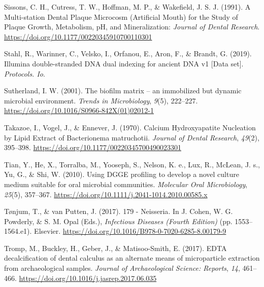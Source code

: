 \documentclass[
  letterpaper,
]{book}
\newlength{\cslhangindent}
\newlength{\cslentryspacingunit} %
\newenvironment{CSLReferences}[2] %
 {%
  \setlength{\parindent}{0pt}
  \ifodd #1
  \let\oldpar\par
  \def\par{\hangindent=\cslhangindent\oldpar}
  \fi
  \setlength{\parskip}{#2\cslentryspacingunit}
 }%
 {}
\begin{document}
\begin{CSLReferences}{1}{0}
\leavevmode{}%
Sissons, C. H., Cutress, T. W., Hoffman, M. P., \& Wakefield, J. S. J.
(1991). A {Multi-station Dental Plaque Microcosm} ({Artificial Mouth})
for the {Study} of {Plaque Growth}, {Metabolism}, {pH}, and
{Mineralization}: \emph{Journal of Dental Research}.
\url{https://doi.org/10.1177/00220345910700110301}

\leavevmode{}%
Stahl, R., Warinner, C., Velsko, I., Orfanou, E., Aron, F., \& Brandt,
G. (2019). Illumina double-stranded {DNA} dual indexing for ancient
{DNA} v1 {[}{Data} set{]}. \emph{Protocols. Io}.

\leavevmode{}%
Sutherland, I. W. (2001). The biofilm matrix -- an immobilized but
dynamic microbial environment. \emph{Trends in Microbiology},
\emph{9}(5), 222--227.
\url{https://doi.org/10.1016/S0966-842X(01)02012-1}

\leavevmode{}%
Takazoe, I., Vogel, J., \& Ennever, J. (1970). Calcium {Hydroxyapatite
Nucleation} by {Lipid Extract} of {Bacterionema} matruchotii.
\emph{Journal of Dental Research}, \emph{49}(2), 395--398.
\url{https://doi.org/10.1177/00220345700490023301}

\leavevmode{}%
Tian, Y., He, X., Torralba, M., Yooseph, S., Nelson, K. e., Lux, R.,
McLean, J. s., Yu, G., \& Shi, W. (2010). Using {DGGE} profiling to
develop a novel culture medium suitable for oral microbial communities.
\emph{Molecular Oral Microbiology}, \emph{25}(5), 357--367.
\url{https://doi.org/10.1111/j.2041-1014.2010.00585.x}

\leavevmode{}%
Tønjum, T., \& van Putten, J. (2017). 179 - {Neisseria}. In J. Cohen, W.
G. Powderly, \& S. M. Opal (Eds.), \emph{Infectious {Diseases} ({Fourth
Edition})} (pp. 1553--1564.e1). {Elsevier}.
\url{https://doi.org/10.1016/B978-0-7020-6285-8.00179-9}

\leavevmode{}%
Tromp, M., Buckley, H., Geber, J., \& Matisoo-Smith, E. (2017). {EDTA}
decalcification of dental calculus as an alternate means of
microparticle extraction from archaeological samples. \emph{Journal of
Archaeological Science: Reports}, \emph{14}, 461--466.
\url{https://doi.org/10.1016/j.jasrep.2017.06.035}


\end{CSLReferences}
\end{document}
